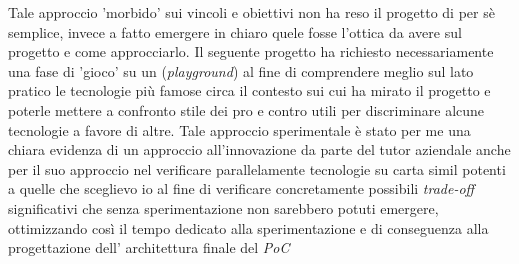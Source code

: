 Tale approccio 'morbido' sui vincoli e obiettivi non ha reso il progetto di per sè semplice, invece a fatto emergere in chiaro quele fosse l'ottica da avere sul progetto
e come approcciarlo.
Il seguente progetto ha richiesto necessariamente una fase di 'gioco' su un (\emph{playground}) al fine di comprendere meglio sul lato pratico le tecnologie più famose circa il contesto
sui cui ha mirato il progetto e poterle mettere a confronto stile dei pro e contro utili per discriminare alcune tecnologie a favore di altre.
Tale approccio sperimentale è stato per me una chiara evidenza di un approccio all'innovazione da parte del tutor aziendale anche per il suo approccio nel verificare parallelamente tecnologie
su carta simil potenti a quelle che sceglievo io al fine di verificare concretamente possibili \emph{trade-off} significativi che senza sperimentazione non sarebbero potuti emergere,
ottimizzando così il tempo dedicato alla sperimentazione e di conseguenza alla progettazione dell' architettura finale del \emph{PoC}





